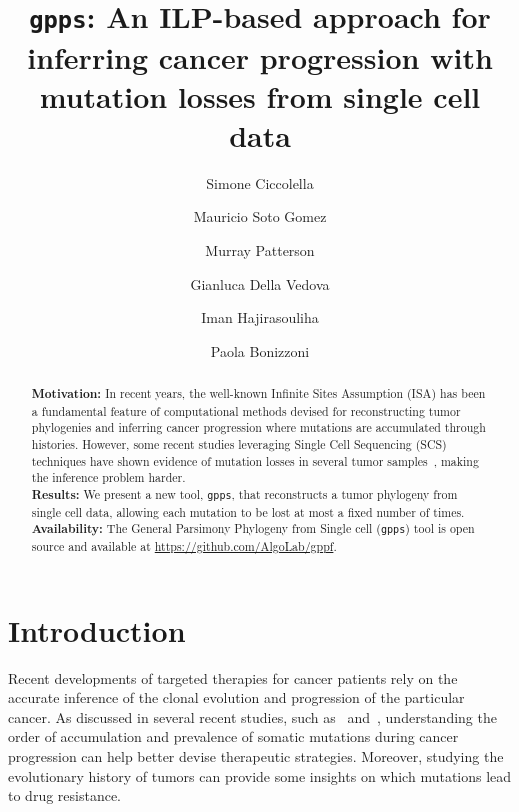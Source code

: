 \documentclass[a4paper,USenglish]{article}
\title{\texttt{gpps}: An ILP-based approach for inferring cancer
  progression with mutation losses from single cell data}
\author{%
  Simone Ciccolella \and
  Mauricio Soto Gomez \and
  Murray Patterson \and
  Gianluca Della Vedova \and
  Iman Hajirasouliha \and
  Paola Bonizzoni}
\theoremstyle{definition}
\begin{document}

\maketitle

\begin{abstract}
  \noindent \textbf{Motivation:} In recent years, the well-known
  Infinite Sites Assumption (ISA) has been a fundamental feature of
  computational methods devised for reconstructing tumor phylogenies
  and inferring cancer progression where mutations are accumulated
  through histories.  However, some recent studies leveraging Single
  Cell Sequencing (SCS) techniques have shown evidence of mutation losses in several tumor samples~\cite{Kuipers13102017}, making the inference problem harder.\\
  \textbf{Results:} We present a new tool, \texttt{gpps}, that
  reconstructs a tumor phylogeny from single
  cell data, allowing each mutation to be lost at most a fixed number of times.\\
  \textbf{Availability:} The General Parsimony Phylogeny from Single
  cell (\texttt{gpps})
  tool is open source and available at   \url{https://github.com/AlgoLab/gppf}.\\
\end{abstract}

\section{Introduction}

Recent developments of targeted therapies for cancer patients rely on
the accurate inference of the clonal evolution and progression of the
particular cancer. As discussed in several recent studies, such
as~\cite{Morrissy2016} and~\cite{Wang2016}, understanding the order of
accumulation and prevalence of somatic mutations during cancer
progression can help better devise therapeutic strategies.  Moreover,
studying the evolutionary history of tumors can provide some insights
on which mutations lead to drug resistance.
\end{document}
